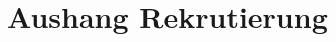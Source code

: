 %
%
\glsresetall

\let\raggedsection\centering 
\chapter{Aushang Rekrutierung}\label{chap.appendix_aushang}
\let\raggedsection\raggedright 
